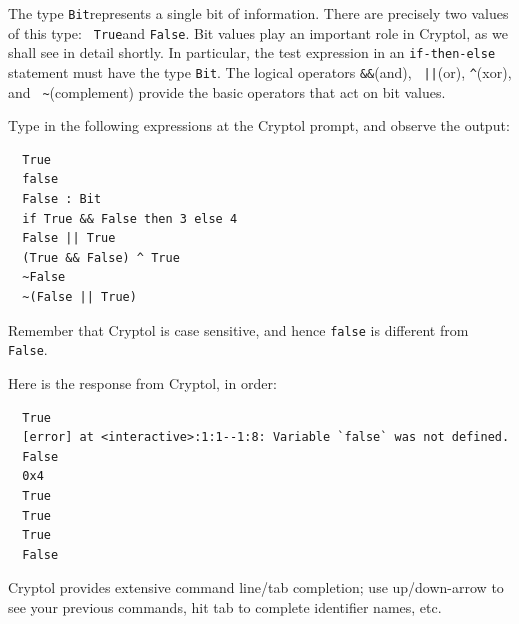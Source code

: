 
The type {\tt Bit}\indTheBitType represents a single bit of
information. There are precisely two values of this type: {\tt
  True}\indTrue and {\tt False}\indFalse. Bit values play an important
role in Cryptol, as we shall see in detail shortly. In particular, the
test expression in an {\tt if-then-else} statement must have the type
{\tt Bit}.  The logical operators {\tt \&\&}\indAnd (and), {\tt
  ||}\indOr (or), {\tt \Verb|^|}\indXOr (xor), and {\tt
  \Verb|~|}\indComplement (complement) provide the basic operators
that act on bit values.

\begin{Exercise}\label{ex:dataBit}
  Type in the following expressions at the Cryptol prompt, and observe
  the output:
\begin{Verbatim}
  True
  false
  False : Bit
  if True && False then 3 else 4
  False || True
  (True && False) ^ True
  ~False
  ~(False || True)
\end{Verbatim}
Remember that Cryptol is case sensitive, and hence {\tt false} is
different from {\tt False}.\indCaseSensitive
\end{Exercise}
\begin{Answer}
Here is the response from Cryptol, in order:
\begin{small}
\begin{Verbatim}
  True
  [error] at <interactive>:1:1--1:8: Variable `false` was not defined.
  False
  0x4
  True
  True
  True
  False
\end{Verbatim}
\end{small}
\end{Answer}

\begin{tip}
  Cryptol provides extensive command line/tab completion; use
  up/down-arrow to see your previous commands, hit tab to complete
  identifier names, etc.
\end{tip}


